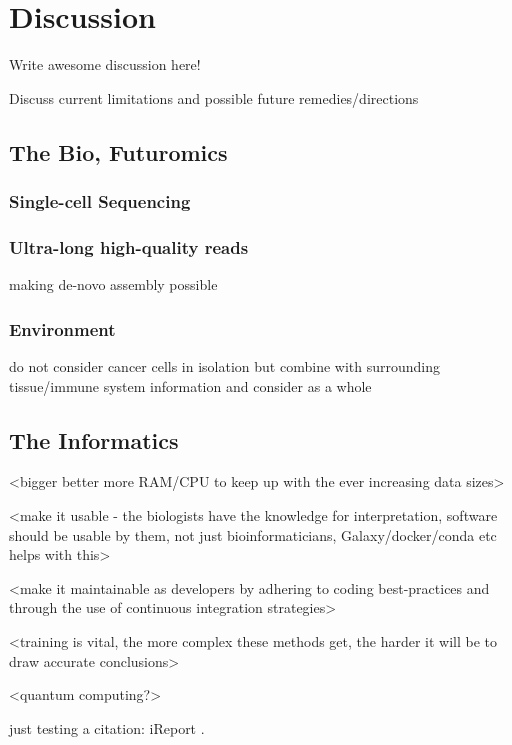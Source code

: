 \chapter{Discussion}
\label{discussion}
\setcounter{figure}{-1}
\setcounter{table}{-1}
\setcounter{section}{-1}
\setcounter{NAT@ctr}{-1}

Write awesome discussion here!

Discuss current limitations and possible future remedies/directions

\section{The Bio, Futuromics}

\subsection{Single-cell Sequencing}

\subsection{Ultra-long high-quality reads}
making de-novo assembly possible

\subsection{Environment}
do not consider cancer cells in isolation but combine with surrounding tissue/immune system information and consider as a whole


\section{The Informatics}

<bigger better more RAM/CPU to keep up with the ever increasing data sizes>

<make it usable - the biologists have the knowledge for interpretation, software should be usable by them, not just bioinformaticians, Galaxy/docker/conda etc helps with this>

<make it maintainable as developers by adhering to coding best-practices and through the use of continuous integration strategies>

<training is vital, the more complex these methods get, the harder it will be to draw accurate conclusions>

<quantum computing?>

just testing a citation: iReport \cite{ireport}.




